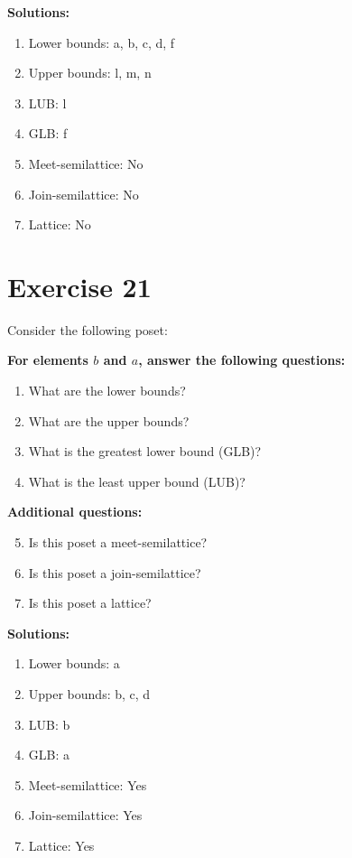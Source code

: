 \documentclass{article}
\begin{document}
\textbf{Solutions:}
\begin{enumerate}
    \item Lower bounds: {a, b, c, d, f}
    \item Upper bounds: {l, m, n}
    \item LUB: l
    \item GLB: f
    \item Meet-semilattice: No
    \item Join-semilattice: No
    \item Lattice: No
\end{enumerate}
\newpage
\section*{Exercise 21}
Consider the following poset:
\begin{center}
\end{center}

    \textbf{For elements $b$ and $a$, answer the following questions:}
\begin{enumerate}
    \item What are the lower bounds?
    \item What are the upper bounds?
    \item What is the greatest lower bound (GLB)?
    \item What is the least upper bound (LUB)?
\end{enumerate}
    \hspace*{3ex} \textbf{Additional questions:}
\begin{enumerate}
    \setcounter{enumi}{4}
    \item Is this poset a meet-semilattice?
    \item Is this poset a join-semilattice?
    \item Is this poset a lattice?
\end{enumerate}

\textbf{Solutions:}
\begin{enumerate}
    \item Lower bounds: {a}
    \item Upper bounds: {b, c, d}
    \item LUB: b
    \item GLB: a
    \item Meet-semilattice: Yes
    \item Join-semilattice: Yes
    \item Lattice: Yes
\end{enumerate}
\newpage
\end{document}

